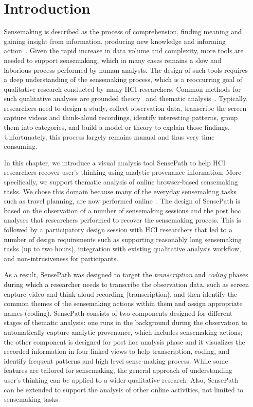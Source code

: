 \section{Introduction}
Sensemaking is described as the process of comprehension, finding meaning and gaining insight from information, producing new knowledge and informing action~\cite{Pirolli2005}. Given the rapid increase in data volume and complexity, more tools are needed to support sensemaking, which in many cases remains a slow and laborious process performed by human analysts. The design of such tools requires a deep understanding of the sensemaking process, which is a reoccurring goal of qualitative research conducted by many HCI researchers. Common methods for such qualitative analyses are grounded theory~\cite{Corbin1994} and thematic analysis~\cite{Guest2011}. Typically, researchers need to design a study, collect observation data, transcribe the screen capture videos and think-aloud recordings, identify interesting patterns, group them into categories, and build a model or theory to explain those findings. Unfortunately, this process largely remains manual and thus very time consuming.

In this chapter, we introduce a visual analysis tool SensePath to help HCI researchers recover user's thinking using analytic provenance information. More specifically, we support thematic analysis of online browser-based sensemaking tasks. We chose this domain because many of the everyday sensemaking tasks such as travel planning, are now performed online~\cite{Russell2008}. The design of SensePath is based on the observation of a number of sensemaking sessions and the post hoc analyses that researchers performed to recover the sensemaking process. This is followed by a participatory design session with HCI researchers that led to a number of design requirements such as supporting reasonably long sensemaking tasks (up to two hours), integration with existing qualitative analysis workflow, and non-intrusiveness for participants. 

As a result, SensePath was designed to target the \emph{transcription} and \emph{coding} phases during which a researcher needs to transcribe the observation data, such as screen capture video and think-aloud recording (transcription), and then identify the common themes of the sensemaking actions within them and assign appropriate names (coding). SensePath consists of two components designed for different stages of thematic analysis: one runs in the background during the observation to automatically capture analytic provenance, which includes sensemaking actions; the other component is designed for post hoc analysis phase and it visualizes the recorded information in four linked views to help transcription, coding, and identify frequent patterns and high level sense-making process. While some features are tailored for sensemaking, the general approach of understanding user's thinking can be applied to a wider qualitative research. Also, SensePath can be extended to support the analysis of other online activities, not limited to sensemaking tasks. 

